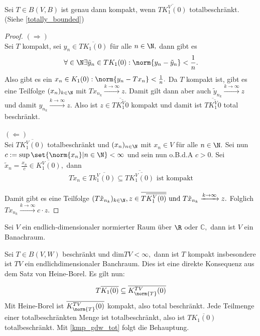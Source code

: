 \begin{theorem} \label{kmp_gdw_tot} Sei $T \in B(V, B)$ ist genau dann kompakt, wenn $\overline{TK_1^V(0)}$ totalbeschränkt. (Siehe \ref{totally_bounded})
	
	
	\begin{proof} $(\Rightarrow)$ \\
		Sei $T$ kompakt, sei $y_n \in \overline{TK_1(0)}$ für alle $n \in \N,$ dann gibt es \[\forall \in \N \exists \tilde y_n \in TK_1(0): \norm{y_n - \tilde y_n} < \frac{1}{n}.\] Also gibt es ein $x_n \in K_1(0): \norm{y_n -Tx_n} < \frac{1}{n}.$ Da $T$ kompakt ist, gibt es eine Teilfolge $(x_n)_{k \in \N}$ mit $Tx_{n_k} \xrightarrow{k \to \infty} z.$ Damit gilt dann aber auch $\tilde y_{n_k} \xrightarrow{k \to \infty} z$ und damit $y_{n_k} \xrightarrow{k \to \infty} z.$ Also ist $z \in \overline{T\overline{K^V_1{0}}}$ kompakt und damit ist $\overline{T\overline{K^V_1{0}}}$ total beschränkt. \\ \\
		$(\Leftarrow)$ \\
		Sei $T\overline{K_1^V(0)}$ totalbeschränkt und $(x_n)_{n \in \N}$ mit $x_n \in V $ für alle $n \in \N.$ Sei nun $c := \sup{\set{\norm{x_n}| n \in \N}} < \infty$ und sein nun o.B.d.A $c > 0.$ Sei $\tilde x_n = \frac{x_n}{c} \in \overline{K_1^V(0)},$ dann \[T\tilde x_n \in T\overline{k_1^V(0)} \subseteq \overline{T\overline{K_1^V(0)}} \text{ ist kompakt}\] \\
		Damit gibt es eine Teilfolge $(T \tilde x_{n_k})_{k \in \N}, z \in \overline{T\overline{K_1^V(0)}} \text{ und } T\tilde x_{n_k} \xrightarrow{k \to \infty} z.$ Folglich $Tx_{n_k} \xrightarrow{k \to \infty} c \cdot z.$
		
	\end{proof}
	
\end{theorem}


\begin{rem} Sei $V$ ein endlich-dimensionaler normierter Raum über $\R$ oder $\mathbb{C},$ dann ist $V$ ein Banachraum. 
	
\end{rem}


\begin{ex}\label{finite_rank_compakt} Sei $T \in B(V, W)$ beschränkt und $\text{dim}{TV} < \infty,$ dann ist $T$ kompakt insbesondere ist $TV$ ein endlichdimensionaler Banchraum. Dies ist eine direkte Konsequenz aus dem Satz von Heine-Borel. Es gilt nun:
	
	
	\[T\overline{K_1(0)} \subseteq \overline{K^{TV}_{\norm{T}}(0)}\]
	Mit Heine-Borel ist $\overline{K^{TV}_{\norm{T}}(0)}$ kompakt, also total beschränkt.  Jede Teilmenge einer totalbeschränkten Menge ist totalbeschränkt, also ist $T\overline{K_1(0)}$ totalbeschränkt. Mit \ref{kmp_gdw_tot} folgt die Behauptung.
	
\end{ex}


